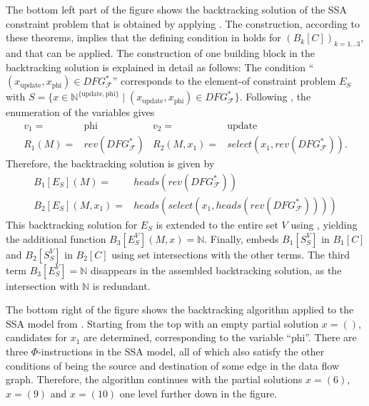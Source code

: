     The bottom left part of the figure shows the backtracking solution
    of the SSA constraint problem that is obtained by applying
    .
    The construction, according to these theorems, implies that the defining
    condition in  holds for $(B_k[C])_{k=1\dots3}$, and
    that  can be applied.
    The construction of one building block in the backtracking solution is
    explained in detail as follows:
    The condition ``$(x_\text{update},x_\text{phi})\in DFG_\mathcal F^*$''
    corresponds to the \mbox{element-of} constraint problem $E_S$ with
    $S=\{x\in\mathbb N^{\{\text{update},\text{phi}\}}\mid (x_\text{update},x_\text{phi})\in DFG_\mathcal F^*\}$.
    Following , the enumeration of the variables gives
    \begin{align*}
    v_1={}&\text{phi}&v_2={}&\text{update}\\
    R_1(M)={}&rev(DFG_\mathcal F^*)&
    R_2(M,x_1)={}&select(x_1,rev(DFG_\mathcal F^*)).
    \end{align*}
    Therefore, the backtracking solution is given by
    \begin{align*}
        B_1[E_S](M)={}&heads(rev(DFG_\mathcal F^*))\\
        B_2[E_S](M,x_1)={}&heads(select(x_1,heads(rev(DFG_\mathcal F^*))))
    \end{align*}
    This backtracking solution for $E_S$ is extended to the entire set $V$ using
    , yielding the additional function
    $B_3[E_S^V](M,x)=\mathbb N$.
    Finally,  embeds $B_1[S_S^V]$ in $B_1[C]$ and
    $B_2[S_S^V]$ in $B_2[C]$ using set intersections with the other terms.
    The third term $B_3[E_S^V]=\mathbb N$ disappears in the assembled
    backtracking solution, as the intersection with $\mathbb N$ is redundant.

    The bottom right of the figure shows the backtracking algorithm applied to
    the SSA model from .
    Starting from the top with an empty partial solution $x=()$, candidates for
    $x_1$ are determined, corresponding to the variable ``phi''.
    There are three $\Phi$-instructions in the SSA model, all of which also
    satisfy the other conditions of being the source and destination of some
    edge in the data flow graph.
    Therefore, the algorithm continues with the partial solutions $x=(6)$,
    $x=(9)$ and $x=(10)$ one level further down in the figure.

